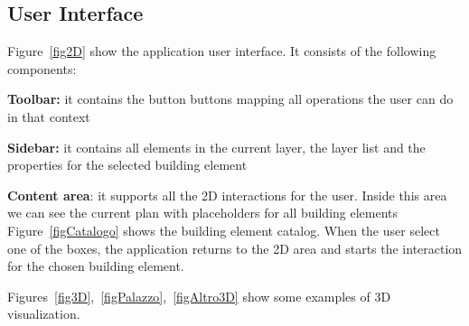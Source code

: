 \subsection{User Interface}\label{ssec:ui}

Figure~\ref{fig2D} show the application user interface. It consists of the following components: 

\textbf{Toolbar:} it contains the button buttons mapping all operations the user can do in that context

\textbf{Sidebar:} it contains all elements in the current layer, the layer list and the properties for the selected building element

\textbf{Content area}: it supports all the 2D interactions for the user. Inside this area we can see the current plan with placeholders for all building elements\\

Figure~\ref{figCatalogo} shows the building element catalog. When the user select one of the boxes, the application returns to the 2D area and starts the interaction for the chosen building element.

Figures~\ref{fig3D},~\ref{figPalazzo},~\ref{figAltro3D} show some examples of 3D visualization.
